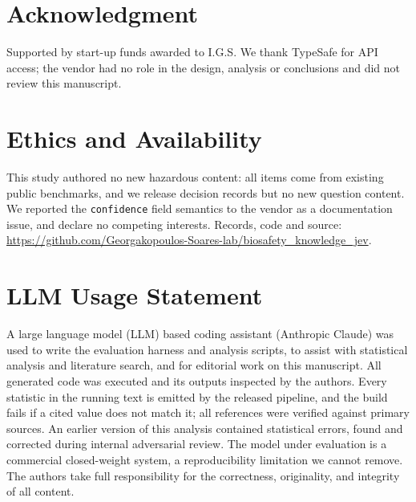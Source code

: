 \documentclass[conference,compsoc]{IEEEtran}
\begin{document}
\section*{Acknowledgment} Supported by start-up funds awarded to I.G.S. We thank TypeSafe
for API access; the vendor had no role in the design, analysis or conclusions and did not
review this manuscript.
\section*{Ethics and Availability} This study authored no new hazardous content: all items
come from existing public benchmarks, and we release decision records but no new question
content. We reported the \texttt{confidence} field semantics to the vendor as a
documentation issue, and declare no competing interests. \sloppy Records, code and source:
\url{https://github.com/Georgakopoulos-Soares-lab/biosafety_knowledge_jev}.

{\footnotesize


}

\section*{LLM Usage Statement}
A large language model (LLM) based coding assistant (Anthropic Claude) was used to write
the evaluation harness
and analysis scripts, to assist with statistical analysis and literature search, and for
editorial work on this manuscript. All generated code was executed and its outputs
inspected by the authors. Every statistic in the running text is emitted by the released
pipeline, and the build fails if a cited value does not match it; all references were
verified against primary sources. An earlier version of this analysis contained statistical
errors, found and corrected during internal adversarial review. The model under evaluation
is a commercial closed-weight system, a reproducibility limitation we cannot remove. The
authors take full responsibility for the correctness, originality, and integrity of all
content.
\end{document}
